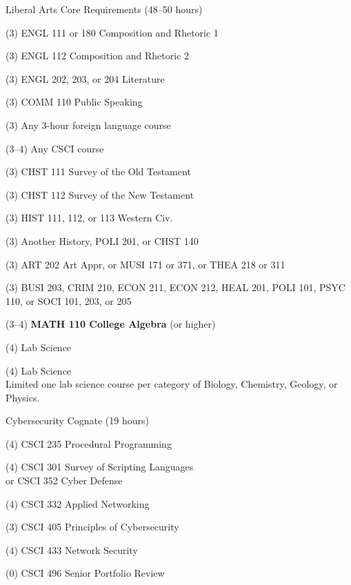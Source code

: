 \begin{reqgroup}{Liberal Arts Core Requirements (48--50 hours)}
\begin{checklist}
\begin{minipage}[t]{0.5\linewidth}
	\item (3) ENGL 111 or 180 Composition and Rhetoric 1
	\item (3) ENGL 112 Composition and Rhetoric 2
	\item (3) ENGL 202, 203, or 204 Literature
	\item (3) COMM 110 Public Speaking
	\item (3) Any 3-hour foreign language course
	\item (3--4) Any CSCI course
	\item (3) CHST 111  Survey of the Old Testament
	\item (3) CHST 112  Survey of the New Testament
	\item (3) HIST 111, 112, or 113 Western Civ.
\end{minipage}
\begin{minipage}[t]{0.5\linewidth}
	\item (3) Another History, POLI 201, or CHST 140
	\item (3) ART 202 Art Appr, or MUSI 171 or 371, or THEA 218 or 311
	\item (3) BUSI 203, CRIM 210, ECON 211, ECON 212, HEAL 201, POLI 101, PSYC 110, or SOCI 101, 203, or 205
	\item (3--4) \textbf{MATH 110 College Algebra} (or higher)
	\item (4) Lab Science
	\item (4) Lab Science\\Limited one lab science course per category of Biology, Chemistry,
Geology, or Physics.
\end{minipage}
\end{checklist}
\end{reqgroup}


\begin{reqgroup}{Cybersecurity Cognate (19 hours)}%
\begin{checklist}%
\begin{minipage}[t]{0.5\linewidth}%
	\item (4) CSCI 235 Procedural Programming
	\item (4) CSCI 301 Survey of Scripting Languages\\
		or CSCI 352 Cyber Defense
	\item (4) CSCI 332 Applied Networking
\end{minipage}%
\begin{minipage}[t]{0.5\linewidth}
	\item (3) CSCI 405 Principles of Cybersecurity
	\item (4) CSCI 433 Network Security
	\item (0) CSCI 496 Senior Portfolio Review
\end{minipage}
\end{checklist}
\end{reqgroup}


